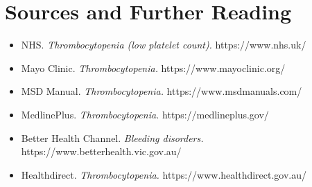 \section*{Sources and Further Reading}
\begin{itemize}
    \item NHS. \textit{Thrombocytopenia (low platelet count).} https://www.nhs.uk/
    \item Mayo Clinic. \textit{Thrombocytopenia.} https://www.mayoclinic.org/
    \item MSD Manual. \textit{Thrombocytopenia.} https://www.msdmanuals.com/
    \item MedlinePlus. \textit{Thrombocytopenia.} https://medlineplus.gov/
    \item Better Health Channel. \textit{Bleeding disorders.} https://www.betterhealth.vic.gov.au/
    \item Healthdirect. \textit{Thrombocytopenia.} https://www.healthdirect.gov.au/
\end{itemize}
